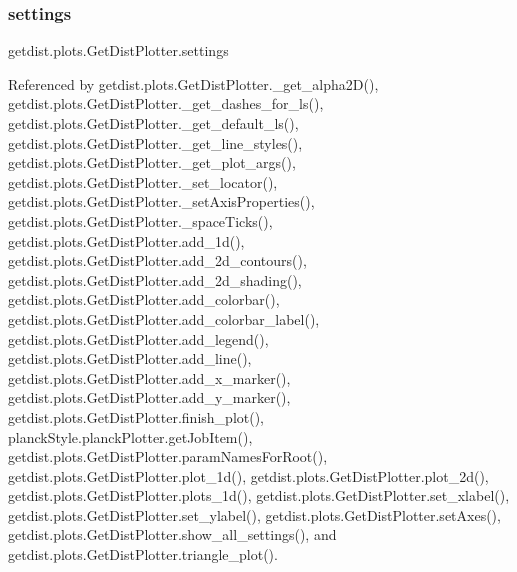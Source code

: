 \mbox{\label{classgetdist_1_1plots_1_1GetDistPlotter_a6957d39a91cc48beffc359eae83aa214}} 
\subsubsection{\texorpdfstring{settings}{settings}}
{\footnotesize\ttfamily getdist.\+plots.\+Get\+Dist\+Plotter.\+settings}



Referenced by getdist.\+plots.\+Get\+Dist\+Plotter.\+\_\+get\+\_\+alpha2\+D(), getdist.\+plots.\+Get\+Dist\+Plotter.\+\_\+get\+\_\+dashes\+\_\+for\+\_\+ls(), getdist.\+plots.\+Get\+Dist\+Plotter.\+\_\+get\+\_\+default\+\_\+ls(), getdist.\+plots.\+Get\+Dist\+Plotter.\+\_\+get\+\_\+line\+\_\+styles(), getdist.\+plots.\+Get\+Dist\+Plotter.\+\_\+get\+\_\+plot\+\_\+args(), getdist.\+plots.\+Get\+Dist\+Plotter.\+\_\+set\+\_\+locator(), getdist.\+plots.\+Get\+Dist\+Plotter.\+\_\+set\+Axis\+Properties(), getdist.\+plots.\+Get\+Dist\+Plotter.\+\_\+space\+Ticks(), getdist.\+plots.\+Get\+Dist\+Plotter.\+add\+\_\+1d(), getdist.\+plots.\+Get\+Dist\+Plotter.\+add\+\_\+2d\+\_\+contours(), getdist.\+plots.\+Get\+Dist\+Plotter.\+add\+\_\+2d\+\_\+shading(), getdist.\+plots.\+Get\+Dist\+Plotter.\+add\+\_\+colorbar(), getdist.\+plots.\+Get\+Dist\+Plotter.\+add\+\_\+colorbar\+\_\+label(), getdist.\+plots.\+Get\+Dist\+Plotter.\+add\+\_\+legend(), getdist.\+plots.\+Get\+Dist\+Plotter.\+add\+\_\+line(), getdist.\+plots.\+Get\+Dist\+Plotter.\+add\+\_\+x\+\_\+marker(), getdist.\+plots.\+Get\+Dist\+Plotter.\+add\+\_\+y\+\_\+marker(), getdist.\+plots.\+Get\+Dist\+Plotter.\+finish\+\_\+plot(), planck\+Style.\+planck\+Plotter.\+get\+Job\+Item(), getdist.\+plots.\+Get\+Dist\+Plotter.\+param\+Names\+For\+Root(), getdist.\+plots.\+Get\+Dist\+Plotter.\+plot\+\_\+1d(), getdist.\+plots.\+Get\+Dist\+Plotter.\+plot\+\_\+2d(), getdist.\+plots.\+Get\+Dist\+Plotter.\+plots\+\_\+1d(), getdist.\+plots.\+Get\+Dist\+Plotter.\+set\+\_\+xlabel(), getdist.\+plots.\+Get\+Dist\+Plotter.\+set\+\_\+ylabel(), getdist.\+plots.\+Get\+Dist\+Plotter.\+set\+Axes(), getdist.\+plots.\+Get\+Dist\+Plotter.\+show\+\_\+all\+\_\+settings(), and getdist.\+plots.\+Get\+Dist\+Plotter.\+triangle\+\_\+plot().

\mbox{\label{classgetdist_1_1plots_1_1GetDistPlotter_a0b8e4309cad0221a75a7debe7078729a}} 
